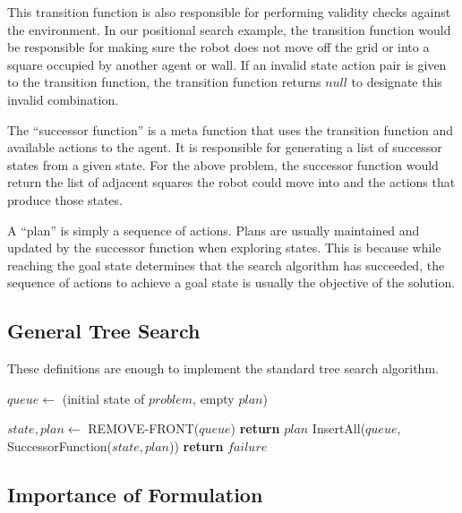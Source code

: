 This transition function is also responsible for performing validity checks against the environment. In our positional search example, the transition function would be responsible for making sure the robot does not move off the grid or into a square occupied by another agent or wall. If an invalid state action pair is given to the transition function, the transition function returns $null$ to designate this invalid combination.

The ``successor function'' is a meta function that uses the transition function and available actions to the agent. It is responsible for generating a list of successor states from a given state. For the above problem, the successor function would return the list of adjacent squares the robot could move into and the actions that produce those states.

A ``plan'' is simply a sequence of actions. Plans are usually maintained and updated by the successor function when exploring states. This is because while reaching the goal state determines that the search algorithm has succeeded, the sequence of actions to achieve a goal state is usually the objective of the solution.

	\subsection{General Tree Search}

These definitions are enough to implement the standard tree search algorithm.

\begin{algorithm}[H]
\begin{algorithmic}[1]
	\State $queue \gets$ (initial state of $problem$, empty $plan$)

		\State $state, plan \gets$ REMOVE-FRONT($queue$)
			\State \textbf{return} $plan$ 
		\EndIf
		\State InsertAll($queue$, SuccessorFunction($state, plan$)) 
	\EndWhile
	\State \textbf{return} $failure$ 

\EndFunction

\end{algorithmic}
\end{algorithm}

	\subsection{Importance of Formulation}

